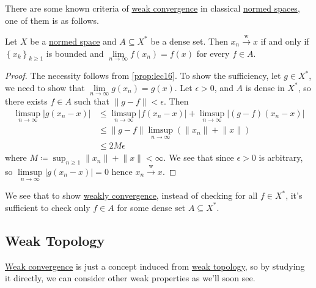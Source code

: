 There are some known criteria of \hyperref[def:weakly-convergence]{weak convergence} in classical \hyperref[def:normed-vector-space]{normed spaces}, one of them is as follows.
\begin{lemma}\label{lma:testing-weak-convergence-on-a-dense-set}
	Let \(X\) be a \hyperref[def:normed-vector-space]{normed space} and \(A \subseteq X^{\ast} \) be a dense set. Then \(x_n \overset{\text{w}}{\to } x\) if and only if \(\left\{ x_k \right\} _{k\geq 1}\) is bounded and \(\lim\limits_{n \to \infty} f(x_n) = f(x)\) for every \(f\in A\).
\end{lemma}
\begin{proof}
	The necessity follows from \autoref{prop:lec16}. To show the sufficiency, let \(g\in X^{\ast} \), we need to show that \(\lim\limits_{n \to \infty} g(x_n) = g(x)\). Let \(\epsilon > 0\), and \(A\) is dense in \(X^{\ast} \), so there exists \(f\in A\) such that \(\left\lVert g-f\right\rVert < \epsilon \). Then
	\[
		\begin{split}
			\limsup_{n \to \infty} \left\vert g(x_n - x) \right\vert
			 & \leq \limsup_{n \to \infty} \left\vert f(x_n - x) \right\vert + \limsup_{n \to \infty} \left\vert (g-f)(x_{n} -x ) \right\vert \\
			 & \leq \left\lVert g-f\right\rVert \limsup_{n \to \infty} (\lVert x_n  \rVert + \lVert x \rVert)                                 \\
			 & \leq 2M\epsilon
		\end{split}
	\]
	where \(M\coloneqq \sup _{n\geq 1} \lVert x_n\rVert + \lVert x \rVert < \infty\). We see that since \(\epsilon > 0\) is arbitrary, so \(\limsup\limits_{n \to \infty} \left\vert g(x_{n} - x ) \right\vert = 0\) hence \(x_n \overset{\text{w}}{\to} x\).
\end{proof}

\begin{note}
	We see that to show \hyperref[def:weakly-convergence]{weakly convergence}, instead of checking for all \(f\in X^{\ast} \), it's sufficient to check only \(f\in A\) for some dense set \(A\subseteq X^{\ast} \).
\end{note}

\subsection{Weak Topology}
\hyperref[def:weakly-convergence]{Weak convergence} is just a concept induced from \hyperref[def:weak-topology]{weak topology}, so by studying it directly, we can consider other weak properties as we'll soon see.


